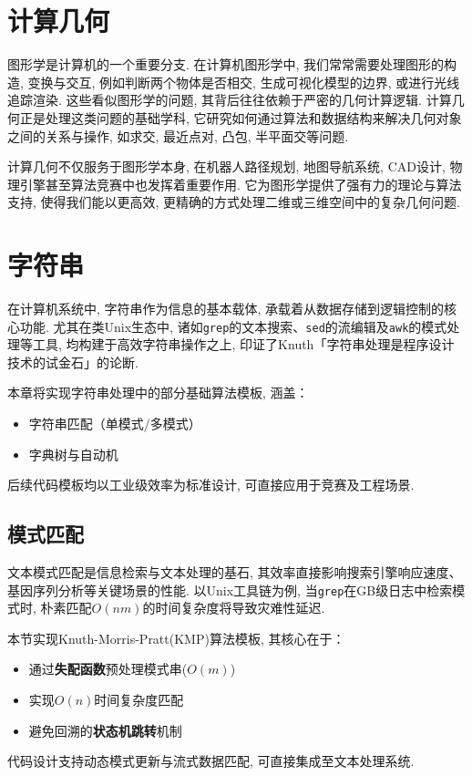 \documentclass[a4paper]{ctexbook}
\begin{document}


\chapter{计算几何}

图形学是计算机的一个重要分支. 在计算机图形学中, 我们常常需要处理图形的构造, 变换与交互, 例如判断两个物体是否相交, 生成可视化模型的边界, 或进行光线追踪渲染. 这些看似图形学的问题, 其背后往往依赖于严密的几何计算逻辑. 计算几何正是处理这类问题的基础学科, 它研究如何通过算法和数据结构来解决几何对象之间的关系与操作, 如求交, 最近点对, 凸包, 半平面交等问题.

计算几何不仅服务于图形学本身, 在机器人路径规划, 地图导航系统, CAD设计, 物理引擎甚至算法竞赛中也发挥着重要作用. 它为图形学提供了强有力的理论与算法支持, 使得我们能以更高效, 更精确的方式处理二维或三维空间中的复杂几何问题.



\chapter{字符串}

在计算机系统中, 字符串作为信息的基本载体, 承载着从数据存储到逻辑控制的核心功能. 尤其在类Unix生态中, 诸如\texttt{grep}的文本搜索、\texttt{sed}的流编辑及\texttt{awk}的模式处理等工具, 均构建于高效字符串操作之上, 印证了Knuth「字符串处理是程序设计技术的试金石」的论断.

本章将实现字符串处理中的部分基础算法模板, 涵盖：
\begin{itemize}
	\item 字符串匹配（单模式/多模式）
	\item 字典树与自动机
\end{itemize}

后续代码模板均以工业级效率为标准设计, 可直接应用于竞赛及工程场景.

\section{模式匹配}

文本模式匹配是信息检索与文本处理的基石, 其效率直接影响搜索引擎响应速度、基因序列分析等关键场景的性能. 以Unix工具链为例, 当\texttt{grep}在GB级日志中检索模式时, 朴素匹配$O(nm)$的时间复杂度将导致灾难性延迟.

本节实现Knuth-Morris-Pratt(KMP)算法模板, 其核心在于：
\begin{itemize}
	\item 通过\textbf{失配函数}预处理模式串($O(m)$)
	\item 实现$O(n)$时间复杂度匹配
	\item 避免回溯的\textbf{状态机跳转}机制
\end{itemize}
代码设计支持动态模式更新与流式数据匹配, 可直接集成至文本处理系统.
\end{document}
